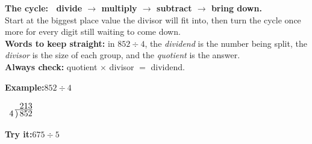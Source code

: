 \documentclass[12pt]{article}
\begin{document}

\begin{formulabox}\textbf{The cycle: \ divide $\rightarrow$ multiply $\rightarrow$ subtract $\rightarrow$ bring down.}\\[3pt]
Start at the biggest place value the divisor will fit into, then turn the cycle
once more for every digit still waiting to come down.\\[2pt]
\textbf{Words to keep straight:} in $852 \div 4$, the \emph{dividend} is the
number being split, the \emph{divisor} is the size of each group, and the
\emph{quotient} is the answer.\\[2pt]
\textbf{Always check:} quotient $\times$ divisor $=$ dividend.
\end{formulabox}
\begin{examplebox}\textbf{Example:}\quad $852 \div 4$
\begin{center}$\begin{array}{r}
213 \\[-3pt]
4\,\overline{\smash{)}\,852}
\end{array}$\end{center}
\end{examplebox}
\begin{tryitbox}\textbf{Try it:}\quad $675 \div 5$\\[2pt]
\end{tryitbox}
\end{document}
